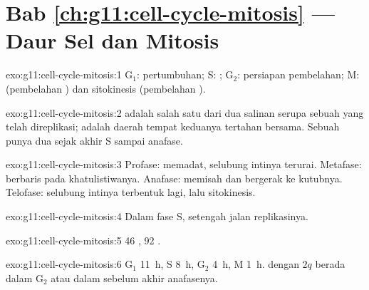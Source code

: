 \section*{Bab \ref{ch:g11:cell-cycle-mitosis} --- Daur Sel dan Mitosis}

\begin{solution}{exo:g11:cell-cycle-mitosis:1}
$\mathrm{G_1}$: pertumbuhan; S: ; $\mathrm{G_2}$:
persiapan pembelahan; M:  (pembelahan ) dan
sitokinesis (pembelahan ).
\end{solution}

\begin{solution}{exo:g11:cell-cycle-mitosis:2}
 adalah salah satu dari dua salinan serupa sebuah  yang
telah direplikasi;  adalah daerah tempat keduanya tertahan
bersama. Sebuah  punya dua  sejak akhir S sampai anafase.
\end{solution}

\begin{solution}{exo:g11:cell-cycle-mitosis:3}
Profase:  memadat, selubung intinya terurai. Metafase:
 berbaris pada khatulistiwanya. Anafase:  memisah
dan bergerak ke kutubnya. Telofase: selubung intinya terbentuk lagi,
lalu sitokinesis.
\end{solution}

\begin{solution}{exo:g11:cell-cycle-mitosis:4}
Dalam fase S, setengah jalan replikasinya.
\end{solution}

\begin{solution}{exo:g11:cell-cycle-mitosis:5}
46 , 92 .
\end{solution}

\begin{solution}{exo:g11:cell-cycle-mitosis:6}
$\mathrm{G_1}$ \qty{11}{h}, S \qty{8}{h}, $\mathrm{G_2}$ \qty{4}{h},
M \qty{1}{h}.  dengan $2q$ berada dalam $\mathrm{G_2}$ atau dalam
 sebelum akhir anafasenya.
\end{solution}

